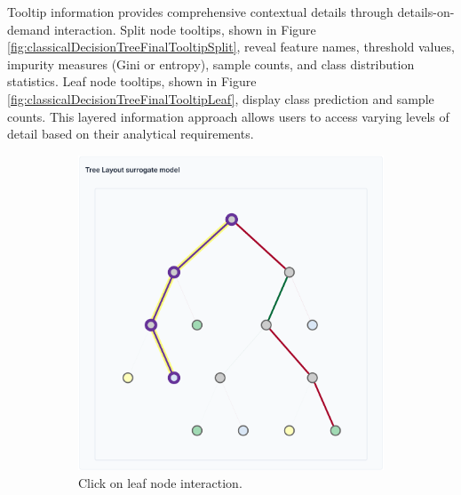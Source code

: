 Tooltip information provides comprehensive contextual details through details-on-demand interaction. Split node tooltips, shown in Figure \ref{fig:classicalDecisionTreeFinalTooltipSplit}, reveal feature names, threshold values, impurity measures (Gini or entropy), sample counts, and class distribution statistics. Leaf node tooltips, shown in Figure \ref{fig:classicalDecisionTreeFinalTooltipLeaf}, display class prediction and sample counts. This layered information approach allows users to access varying levels of detail based on their analytical requirements.

\begin{figure}
    \centering
    \begin{subfigure}[c]{0.48\textwidth}
        \centering
        \includegraphics[width=\linewidth]{images/classicalDecisionTreeFinalLeafInteraction.png}
        \caption{Click on leaf node interaction.}
        \label{fig:classicDecisionTreeFinalLefClick}
    \end{subfigure}
    \vspace{0.3cm}
    \begin{subfigure}[c]{0.48\linewidth}
        \centering

\end{subfigure}
\end{figure}
